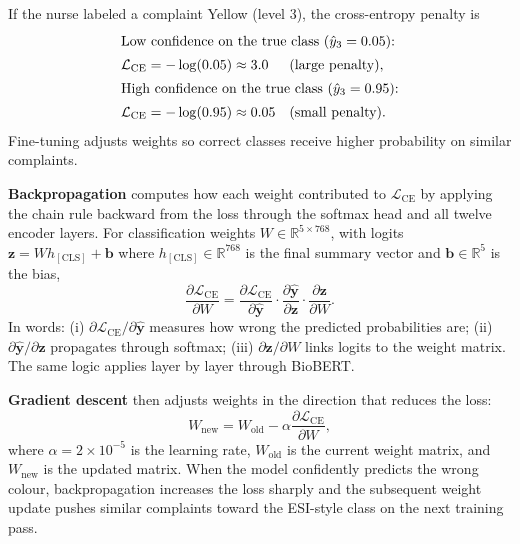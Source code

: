 \begin{example}
If the nurse labeled a complaint Yellow (level 3), the cross-entropy penalty is
\begin{align*}
  \shortintertext{Low confidence on the true class (\(\hat{y}_3 = 0.05\)):}
  \mathcal{L}_{\mathrm{CE}} = -\log(0.05) &\approx 3.0 && \text{(large penalty)}, \\
  \shortintertext{High confidence on the true class (\(\hat{y}_3 = 0.95\)):}
  \mathcal{L}_{\mathrm{CE}} = -\log(0.95) &\approx 0.05 && \text{(small penalty)}.
\end{align*}
Fine-tuning adjusts weights so correct classes receive higher probability on similar complaints.
\end{example}

\textbf{Backpropagation} computes how each weight contributed to \(\mathcal{L}_{\mathrm{CE}}\) by applying the chain rule backward from the loss through the softmax head and all twelve encoder layers. For classification weights \(W \in \mathbb{R}^{5 \times 768}\), with logits \(\mathbf{z} = W h_{\mathrm{[CLS]}} + \mathbf{b}\) where \(h_{\mathrm{[CLS]}} \in \mathbb{R}^{768}\) is the final summary vector and \(\mathbf{b} \in \mathbb{R}^{5}\) is the bias,
\begin{equation}
  \frac{\partial \mathcal{L}_{\mathrm{CE}}}{\partial W} = \frac{\partial \mathcal{L}_{\mathrm{CE}}}{\partial \hat{\mathbf{y}}} \cdot \frac{\partial \hat{\mathbf{y}}}{\partial \mathbf{z}} \cdot \frac{\partial \mathbf{z}}{\partial W}.
\end{equation}
In words: (i) \(\partial \mathcal{L}_{\mathrm{CE}}/\partial \hat{\mathbf{y}}\) measures how wrong the predicted probabilities are; (ii) \(\partial \hat{\mathbf{y}}/\partial \mathbf{z}\) propagates through softmax; (iii) \(\partial \mathbf{z}/\partial W\) links logits to the weight matrix. The same logic applies layer by layer through BioBERT.

\textbf{Gradient descent} then adjusts weights in the direction that reduces the loss:
\begin{equation}
  W_{\mathrm{new}} = W_{\mathrm{old}} - \alpha \frac{\partial \mathcal{L}_{\mathrm{CE}}}{\partial W},
\end{equation}
where \(\alpha = 2 \times 10^{-5}\) is the learning rate, \(W_{\mathrm{old}}\) is the current weight matrix, and \(W_{\mathrm{new}}\) is the updated matrix. When the model confidently predicts the wrong colour, backpropagation increases the loss sharply and the subsequent weight update pushes similar complaints toward the ESI-style class on the next training pass.

